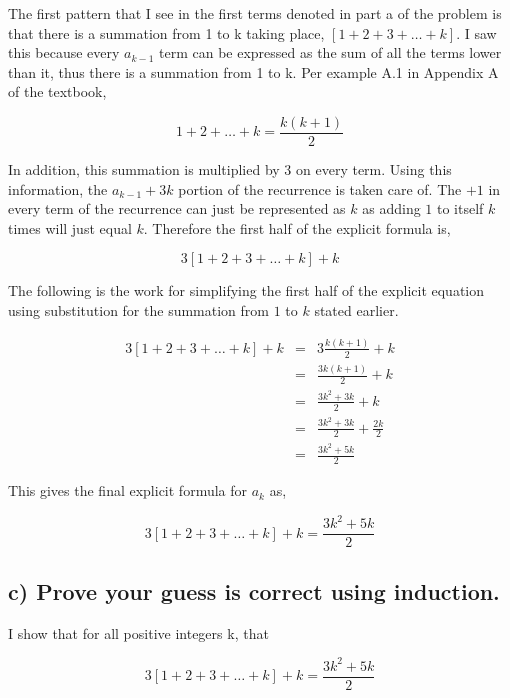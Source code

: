 \documentclass[11pt]{article}
\begin{document}
\bigskip
\bigskip
The first pattern that I see in the first terms denoted in part a of the problem is that there is a summation from 1 to k taking place, $[1+2+3+\dots+k]$. I saw this because every $a_{k-1}$ term can be expressed as the sum of all the terms lower than it, thus there is a summation from 1 to k. Per example A.1 in Appendix A of the textbook,

\begin{equation*}
1+2+ \dots + k = \frac{k(k+1)}{2}
\end{equation*}

\bigskip
In addition, this summation is multiplied by 3 on every term. Using this information, the $a_{k-1} + 3k$ portion of the recurrence is taken care of. The $+1$ in every term of the recurrence can just be represented as $k$ as adding $1$ to itself $k$ times will just equal $k$. Therefore the first half of the explicit formula is,

\begin{equation*}
3[1+2+3+\dots+k]+k
\end{equation*}

\noindent The following is the work for simplifying the first half of the explicit equation using substitution for the summation from $1$ to $k$ stated earlier.

\begin{eqnarray*}
3[1+2+3+\dots+k] +k &=& 3 \frac{k(k+1)}{2}+k \\
	&=& \frac{3k(k+1)}{2}+k \\
	&=& \frac{3k^2 +3k}{2}+k \\
	&=& \frac{3k^2 +3k}{2} + \frac{2k}{2} \\
	&=& \frac{3k^2 +5k}{2}
\end{eqnarray*}

\noindent This gives the final explicit formula for $a_k$ as,

\begin{equation*}
3[1+2+3+\dots+k] +k = \frac{3k^2 +5k}{2}
\end{equation*}

\bigskip


\subsection*{c) Prove your guess is correct using induction.}

\bigskip

\noindent I show that for all positive integers k, that 

\begin{equation*}
3[1+2+3+\dots+k] +k = \frac{3k^2 +5k}{2}
\end{equation*}
\end{document}
